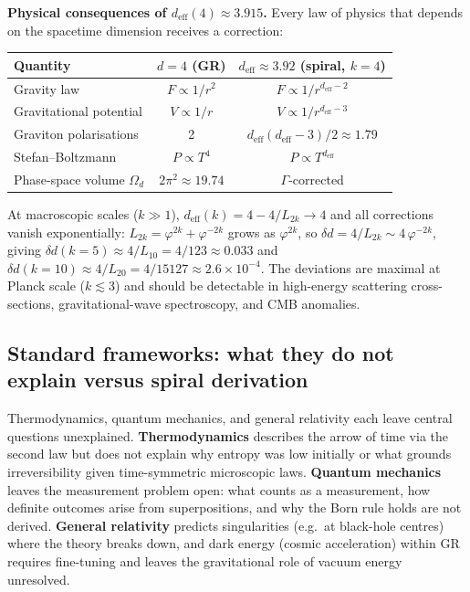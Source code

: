 \documentclass[12pt,a4paper]{article}
\begin{document}
\textbf{Physical consequences of $d_{\mathrm{eff}}(4) \approx 3.915$.} Every law of physics that depends on the spacetime dimension receives a correction:
\begin{center}
\begin{tabular}{|l|c|c|}
\hline
\textbf{Quantity} & \textbf{$d = 4$ (GR)} & \textbf{$d_{\mathrm{eff}} \approx 3.92$ (spiral, $k{=}4$)} \\
\hline
Gravity law & $F \propto 1/r^2$ & $F \propto 1/r^{d_{\mathrm{eff}}-2}$ \\
Gravitational potential & $V \propto 1/r$ & $V \propto 1/r^{d_{\mathrm{eff}}-3}$ \\
Graviton polarisations & 2 & $d_{\mathrm{eff}}(d_{\mathrm{eff}}-3)/2 \approx 1.79$ \\
Stefan--Boltzmann & $P \propto T^4$ & $P \propto T^{d_{\mathrm{eff}}}$ \\
Phase-space volume $\Omega_d$ & $2\pi^2 \approx 19.74$ & $\Gamma$-corrected \\
\hline
\end{tabular}
\end{center}
At macroscopic scales ($k \gg 1$), $d_{\mathrm{eff}}(k) = 4 - 4/L_{2k} \to 4$ and all corrections vanish exponentially: $L_{2k} = \varphi^{2k} + \varphi^{-2k}$ grows as $\varphi^{2k}$, so $\delta d = 4/L_{2k} \sim 4\,\varphi^{-2k}$, giving $\delta d(k{=}5) \approx 4/L_{10} = 4/123 \approx 0.033$ and $\delta d(k{=}10) \approx 4/L_{20} = 4/15127 \approx 2.6 \times 10^{-4}$. The deviations are maximal at Planck scale ($k \lesssim 3$) and should be detectable in high-energy scattering cross-sections, gravitational-wave spectroscopy, and CMB anomalies.

\subsection{Standard frameworks: what they do not explain versus spiral derivation}
\label{sec:thermo-qm-gr-gaps}

Thermodynamics, quantum mechanics, and general relativity each leave central questions unexplained. \textbf{Thermodynamics} describes the arrow of time via the second law but does not explain why entropy was low initially or what grounds irreversibility given time-symmetric microscopic laws. \textbf{Quantum mechanics} leaves the measurement problem open: what counts as a measurement, how definite outcomes arise from superpositions, and why the Born rule holds are not derived. \textbf{General relativity} predicts singularities (e.g.\ at black-hole centres) where the theory breaks down, and dark energy (cosmic acceleration) within GR requires fine-tuning and leaves the gravitational role of vacuum energy unresolved.
\end{document}
